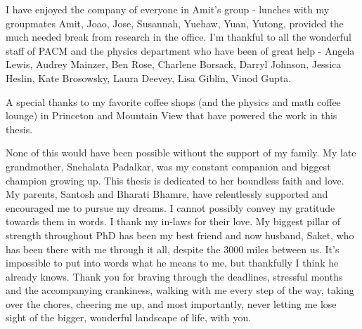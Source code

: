 I have enjoyed the company of everyone in Amit's group - lunches with my groupmates Amit, Joao, Jose, Susannah, Yuehaw, Yuan, Yutong, provided the much needed break from research in the office. I'm thankful to all the wonderful staff of PACM and the physics department who have been of great help - Angela Lewis, Audrey Mainzer, Ben Rose, Charlene Borsack, Darryl Johnson, Jessica Heslin, Kate Brosowsky, Laura Deevey, Lisa Giblin, Vinod Gupta.

A special thanks to my favorite coffee shops (and the physics and math coffee lounge) in Princeton and Mountain View that have powered the work in this thesis.

None of this would have been possible without the support of my family. My late grandmother, Snehalata Padalkar, was my constant companion and biggest champion growing up. This thesis is dedicated to her boundless faith and love. My parents, Santosh and Bharati Bhamre, have relentlessly supported and encouraged me to pursue my dreams. I cannot possibly convey my gratitude towards them in words. I thank my in-laws for their love. My biggest pillar of strength throughout PhD has been my best friend and now husband, Saket, who has been there with me through it all, despite the 3000 miles between us. It's impossible to put into words what he means to me, but thankfully I think he already knows. Thank you for braving through the deadlines, stressful months and the accompanying crankiness, walking with me every step of the way, taking over the chores, cheering me up, and most importantly, never letting me lose sight of the bigger, wonderful landscape of life, with you. 
